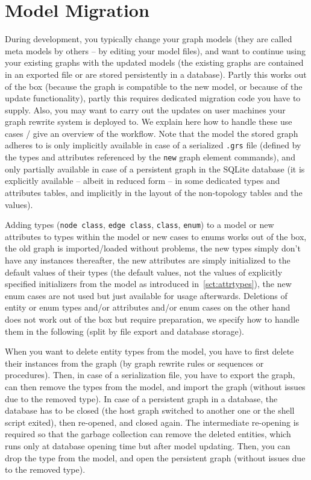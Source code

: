 \section{Model Migration}
\label{modelmigration}

During development, you typically change your graph models (they are called meta models by others -- by editing your model files), and want to continue using your existing graphs with the updated models
(the existing graphs are contained in an exported file or are stored persistently in a database).
Partly this works out of the box (because the graph is compatible to the new model, or because of the update functionality), partly this requires dedicated migration code you have to supply.
Also, you may want to carry out the updates on user machines your graph rewrite system is deployed to.
We explain here how to handle these use cases / give an overview of the workflow.
Note that the model the stored graph adheres to is only implicitly available in case of a serialized \texttt{.grs} file (defined by the types and attributes referenced by the \texttt{new} graph element commands), and only partially available in case of a persistent graph in the SQLite database (it is explicitly available -- albeit in reduced form -- in some dedicated types and attributes tables, and implicitly in the layout of the non-topology tables and the values).

Adding types (\texttt{node class}, \texttt{edge class}, \texttt{class}, \texttt{enum}) to a model or new attributes to types within the model or new cases to enums works out of the box, the old graph is imported/loaded without problems, the new types simply don't have any instances thereafter, the new attributes are simply initialized to the default values of their types (the \GrG{} default values, not the values of explicitly specified initializers from the model as introduced in~\ref{sct:attrtypes}), the new enum cases are not used but just available for usage afterwards.
Deletions of entity or enum types and/or attributes and/or enum cases on the other hand does not work out of the box but require preparation, we specify how to handle them in the following (split by file export and database storage).

When you want to delete entity types from the model, you have to first delete their instances from the graph (by graph rewrite rules or sequences or procedures).
Then, in case of a serialization file, you have to export the graph, can then remove the types from the model, and import the graph (without issues due to the removed type).
In case of a  persistent graph in a database, the database has to be closed (the host graph switched to another one or the shell script exited), then re-opened, and closed again. 
The intermediate re-opening is required so that the garbage collection can remove the deleted entities, which runs only at database opening time but after model updating.
Then, you can drop the type from the model, and open the persistent graph (without issues due to the removed type).

